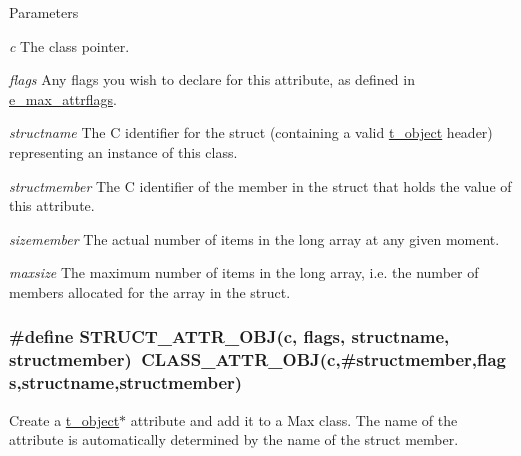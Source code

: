 \begin{DoxyParams}{Parameters}
\item[{\em c}]The class pointer. \item[{\em flags}]Any flags you wish to declare for this attribute, as defined in \hyperlink{group__attr_gaf296cfc6741bb19207f6ed8062809115}{e\_\-max\_\-attrflags}. \item[{\em structname}]The C identifier for the struct (containing a valid \hyperlink{structt__object}{t\_\-object} header) representing an instance of this class. \item[{\em structmember}]The C identifier of the member in the struct that holds the value of this attribute. \item[{\em sizemember}]The actual number of items in the long array at any given moment. \item[{\em maxsize}]The maximum number of items in the long array, i.e. the number of members allocated for the array in the struct. \end{DoxyParams}
\hypertarget{group__attr_ga7b440c21c972a30de940b2c29ef692d3}{
\subsubsection[{STRUCT\_\-ATTR\_\-OBJ}]{\setlength{\rightskip}{0pt plus 5cm}\#define STRUCT\_\-ATTR\_\-OBJ(c, \/  flags, \/  structname, \/  structmember)~CLASS\_\-ATTR\_\-OBJ(c,\#structmember,flags,structname,structmember)}}
\label{group__attr_ga7b440c21c972a30de940b2c29ef692d3}


Create a \hyperlink{structt__object}{t\_\-object}$\ast$ attribute and add it to a Max class. The name of the attribute is automatically determined by the name of the struct member.


